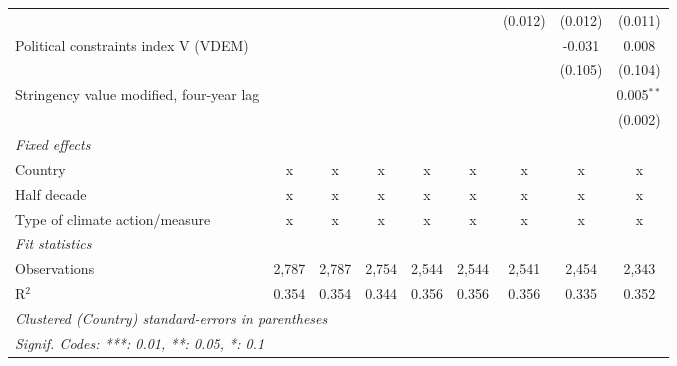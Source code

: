 \begin{tabular}{lcccccccc}
                                                     &              &              &               &              &              & (0.012)      & (0.012)      & (0.011)\\   
   Political constraints index V (VDEM)              &              &              &               &              &              &              & -0.031       & 0.008\\   
                                                     &              &              &               &              &              &              & (0.105)      & (0.104)\\   
   Stringency value modified, four-year lag          &              &              &               &              &              &              &              & 0.005$^{**}$\\   
                                                     &              &              &               &              &              &              &              & (0.002)\\   
   \emph{Fixed effects}\\
   Country                                           & x            & x            & x             & x            & x            & x            & x            & x\\  
   Half decade                                       & x            & x            & x             & x            & x            & x            & x            & x\\  
   Type of climate action/measure                    & x            & x            & x             & x            & x            & x            & x            & x\\  
   \midrule \emph{Fit statistics}\\
   Observations                                      & 2,787        & 2,787        & 2,754         & 2,544        & 2,544        & 2,541        & 2,454        & 2,343\\  
   R$^2$                                             & 0.354        & 0.354        & 0.344         & 0.356        & 0.356        & 0.356        & 0.335        & 0.352\\  
   \midrule
   \multicolumn{9}{l}{\emph{Clustered (Country) standard-errors in parentheses}}\\
   \multicolumn{9}{l}{\emph{Signif. Codes: ***: 0.01, **: 0.05, *: 0.1}}\\
\end{tabular}
\par\endgroup


